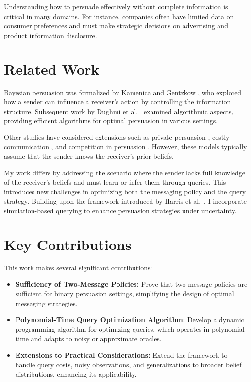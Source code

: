 \documentclass[12pt]{article}
\begin{document}
Understanding how to persuade effectively without complete information is critical in many domains. For instance, companies often have limited data on consumer preferences and must make strategic decisions on advertising and product information disclosure.

\section{Related Work}

Bayesian persuasion was formalized by Kamenica and Gentzkow \cite{Kamenica2011}, who explored how a sender can influence a receiver's action by controlling the information structure. Subsequent work by Dughmi et al.\ \cite{Dughmi2014} examined algorithmic aspects, providing efficient algorithms for optimal persuasion in various settings.

Other studies have considered extensions such as private persuasion \cite{Arieli2016}, costly communication \cite{Taneva2019}, and competition in persuasion \cite{Gentzkow2016}. However, these models typically assume that the sender knows the receiver's prior beliefs.

My work differs by addressing the scenario where the sender lacks full knowledge of the receiver's beliefs and must learn or infer them through queries. This introduces new challenges in optimizing both the messaging policy and the query strategy. Building upon the framework introduced by Harris et al.\ \cite{Harris2023}, I incorporate simulation-based querying to enhance persuasion strategies under uncertainty.

\section{Key Contributions}

This work makes several significant contributions:

\begin{itemize}
    \item \textbf{Sufficiency of Two-Message Policies:} Prove that two-message policies are sufficient for binary persuasion settings, simplifying the design of optimal messaging strategies.
    \item \textbf{Polynomial-Time Query Optimization Algorithm:} Develop a dynamic programming algorithm for optimizing queries, which operates in polynomial time and adapts to noisy or approximate oracles.
    \item \textbf{Extensions to Practical Considerations:} Extend the framework to handle query costs, noisy observations, and generalizations to broader belief distributions, enhancing its applicability.
\end{itemize}
\end{document}
